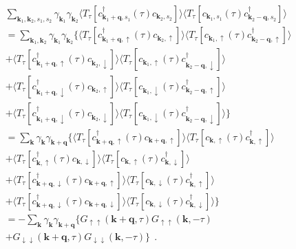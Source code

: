 \documentclass[a4j]{jsarticle}
\begin{document}
\begin{align}
	&
	\sum_{\bm{k}_{1} , \bm{k}_{2} , s_{1} ,s_{2} }
	\gamma_{\bm{k}_{1}}
	\gamma_{\bm{k}_{2}}
	\langle T_{\tau} [
			c_{ \bm{k}_{1}+\bm{q} , s_{1} }^{\dagger} (\tau)
			c_{ \bm{k}_{2} , s_{2} }
		] \rangle
	\langle T_{\tau} [
			c_{ \bm{k}_{1} , s_{1} } (\tau)
			c_{ \bm{k}_{2}-\bm{q} , s_{2} }^{\dagger}
		] \rangle
	\\ &=
	\sum_{\bm{k}_{1} , \bm{k}_{2} }
	\gamma_{\bm{k}_{1}}
	\gamma_{\bm{k}_{2}}
	\Big\{
	\langle T_{\tau} [
			c_{ \bm{k}_{1}+\bm{q} , \uparrow }^{\dagger} (\tau)
			c_{ \bm{k}_{2} , \uparrow }
		] \rangle
	\langle T_{\tau} [
			c_{ \bm{k}_{1} , \uparrow } (\tau)
			c_{ \bm{k}_{2}-\bm{q} , \uparrow }^{\dagger}
		] \rangle
	\nonumber \\[2mm] &+
	\langle T_{\tau} [
			c_{ \bm{k}_{1}+\bm{q} , \uparrow }^{\dagger} (\tau)
			c_{ \bm{k}_{2} , \downarrow }
		] \rangle
	\langle T_{\tau} [
			c_{ \bm{k}_{1} , \uparrow } (\tau)
			c_{ \bm{k}_{2}-\bm{q} , \downarrow }^{\dagger}
		] \rangle
	\nonumber \\[2mm] &+
	\langle T_{\tau} [
			c_{ \bm{k}_{1}+\bm{q} , \downarrow }^{\dagger} (\tau)
			c_{ \bm{k}_{2} , \uparrow }
		] \rangle
	\langle T_{\tau} [
			c_{ \bm{k}_{1} , \downarrow } (\tau)
			c_{ \bm{k}_{2}-\bm{q} , \uparrow }^{\dagger}
		] \rangle
	\nonumber \\[2mm] &+
	\langle T_{\tau} [
			c_{ \bm{k}_{1}+\bm{q} , \downarrow }^{\dagger} (\tau)
			c_{ \bm{k}_{2} , \downarrow }
		] \rangle
	\langle T_{\tau} [
			c_{ \bm{k}_{1} , \downarrow } (\tau)
			c_{ \bm{k}_{2}-\bm{q} , \downarrow }^{\dagger}
		] \rangle
	\Big\}
	\nonumber \\[3mm]
	&=
	\sum_{ \bm{k} }
	\gamma_{\bm{k}}
	\gamma_{\bm{k}+\bm{q}}
	\Big\{
	\langle T_{\tau} [
			c_{ \bm{k}+\bm{q} , \uparrow }^{\dagger} (\tau)
			c_{ \bm{k}+\bm{q} , \uparrow }
		] \rangle
	\langle T_{\tau} [
			c_{ \bm{k} , \uparrow } (\tau)
			c_{ \bm{k} , \uparrow }^{\dagger}
		] \rangle
	\nonumber \\[2mm] &+
	\langle T_{\tau} [
			c_{ \bm{k} , \uparrow }^{\dagger} (\tau)
			c_{ \bm{k} , \downarrow }
		] \rangle
	\langle T_{\tau} [
			c_{ \bm{k} , \uparrow } (\tau)
			c_{ \bm{k} , \downarrow }^{\dagger}
		] \rangle
	\nonumber \\[2mm] &+
	\langle T_{\tau} [
			c_{ \bm{k}+\bm{q} , \downarrow }^{\dagger} (\tau)
			c_{ \bm{k}+\bm{q} , \uparrow }
		] \rangle
	\langle T_{\tau} [
			c_{ \bm{k} , \downarrow } (\tau)
			c_{ \bm{k} , \uparrow }^{\dagger}
		] \rangle
	\nonumber \\[2mm] &+
	\langle T_{\tau} [
			c_{ \bm{k}+\bm{q} , \downarrow }^{\dagger} (\tau)
			c_{ \bm{k}+\bm{q} , \downarrow }
		] \rangle
	\langle T_{\tau} [
			c_{ \bm{k} , \downarrow } (\tau)
			c_{ \bm{k} , \downarrow }^{\dagger}
		] \rangle
	\Big\}
	\nonumber \\[3mm]
	&=
	-
	\sum_{ \bm{k} }
	\gamma_{\bm{k}}
	\gamma_{\bm{k}+\bm{q}}
	\Big\{
	G_{\uparrow \uparrow}( \bm{k}+\bm{q} , \tau)
	G_{\uparrow \uparrow}( \bm{k} , - \tau)
	\nonumber \\[-1mm] &+
	G_{\downarrow \downarrow}( \bm{k}+\bm{q} , \tau)
	G_{\downarrow \downarrow}( \bm{k} , - \tau)
	\Big\}
	\ \ .
\end{align}
\end{document}
